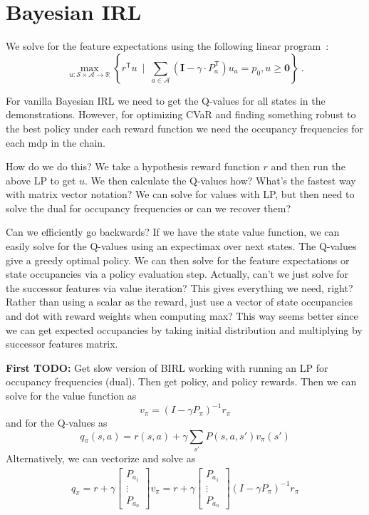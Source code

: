 \documentclass{article}
\newcommand{\tr}{^\mathsf{T}}
\newcommand{\zero}{\mathbf{0}}
\newcommand{\eye}{\mathbf{I}}
\newcommand{\states}{\mathcal{S}}
\newcommand{\actions}{\mathcal{A}}
\newcommand{\Real}{\mathbb{R}}
\begin{document}
 
\section{Bayesian IRL}

We solve for the feature expectations using the following linear program~\cite{Puterman2005}:
	\[\max_{u:\states\times\actions\to\Real} \left\{ r\tr u ~\mid~ \sum_{a\in\mathcal{A}} (\eye - \gamma\cdot P_a\tr) u_a = p_0, u \ge \zero \right\}~. \]
	
For vanilla Bayesian IRL we need to get the Q-values for all states in the demonstrations. However, for optimizing CVaR and finding something robust to the best policy under each reward function we need the occupancy frequencies for each mdp in the chain. 

How do we do this? We take a hypothesis reward function $r$ and then run the above LP to get $u$. We then calculate the Q-values how? What's the fastest way with matrix vector notation? We can solve for values with LP, but then need to solve the dual for occupancy frequencies or can we recover them?

Can we efficiently go backwards? If we have the state value function, we can easily solve for the Q-values using an expectimax over next states. The Q-values give a greedy optimal policy. We can then solve for the feature expectations or state occupancies via a policy evaluation step. Actually, can't we just solve for the successor features via value iteration? This gives everything we need, right? Rather than using a scalar as the reward, just use a vector of state occupancies and dot with reward weights when computing max? This way seems better since we can get expected occupancies by taking initial distribution and multiplying by successor features matrix. 

\textbf{First TODO:}
Get slow version of BIRL working with running an LP for occupancy frequencies (dual). Then get policy, and policy rewards. Then we can solve for the value function as 
\begin{equation}
v_\pi = (I - \gamma P_\pi)^{-1} r_\pi
\end{equation}
and for the Q-values as
\begin{equation}
q_\pi(s,a) = r(s,a) + \gamma \sum_{s'} P(s,a,s') v_\pi(s')
\end{equation}
Alternatively, we can vectorize and solve as 
\begin{eqnarray}
q_\pi = r + \gamma 
\begin{bmatrix}
P_{a_1} \\
\vdots \\
P_{a_n}
\end{bmatrix}
 v_\pi
 = r + \gamma 
\begin{bmatrix}
P_{a_1} \\
\vdots \\
P_{a_n}
\end{bmatrix}
(I - \gamma P_\pi)^{-1} r_\pi
\end{eqnarray}
\end{document}
